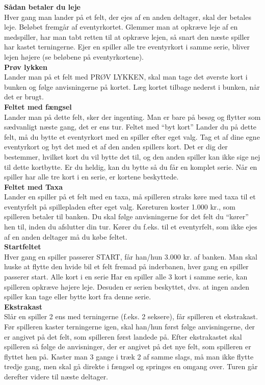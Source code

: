 \textbf{Sådan betaler du leje}
\\Hver gang man lander på et felt, der ejes af en anden deltager, skal der betales leje. Beløbet fremgår af eventyrkortet. Glemmer man at opkræve leje af en medspiller, har man tabt retten til at opkræve lejen, så snart den næste spiller har kastet terningerne. Ejer en spiller alle tre eventyrkort i samme serie, bliver lejen højere (se beløbene på eventyrkortene).\\

\textbf{Prøv lykken}
\\Lander man på et felt med PRØV LYKKEN, skal man tage det øverste kort i bunken og følge anvisningerne på kortet. 
Læg kortet tilbage nederst i bunken, når det er brugt.\\

\textbf{Feltet med fængsel}
\\Lander man på dette felt, sker der ingenting. 
Man er bare på besøg og flytter som sædvanligt næste gang, det er ens tur. Feltet med “byt kort”
Lander du på dette felt, må du bytte et eventyrkort med en spiller efter eget valg. 
Tag et af dine egne eventyrkort og byt det med et af den anden spillers kort. 
Det er dig der bestemmer, hvilket kort du vil bytte det til, og den anden spiller kan ikke sige nej til dette kortbytte. 
Er du heldig, kan du bytte så du får en komplet serie. 
Når en spiller har alle tre kort i en serie, er kortene beskyttede.\\

\textbf{Feltet med Taxa}
\\Lander en spiller på et felt med en taxa, må spilleren straks køre med taxa til et eventyrfelt på spillepladen efter eget valg. 
Køreturen koster 1.000 kr., som spilleren betaler til banken. 
Du skal følge anvisningerne for det felt du “kører” hen til, inden du afslutter din tur. 
Kører du f.eks. til et eventyrfelt, som ikke ejes af en anden deltager må du købe feltet.\\

\textbf{Startfeltet}
\\Hver gang en spiller passerer START, får han/hun 3.000 kr. af banken. Man skal huske at flytte den hvide bil et felt fremad på inderbanen, hver gang en spiller passerer start. Alle kort i en serie
Har en spiller alle 3 kort i samme serie, kan spilleren opkræve højere leje. Desuden er serien beskyttet, dvs. at ingen anden spiller kan tage eller bytte kort fra denne serie.\\

\textbf{Ekstrakast}
\\Slår en spiller 2 ens med terningerne (f.eks. 2 seksere), får spilleren et ekstrakast. 
Før spilleren kaster terningerne igen, skal han/hun først følge anvisningerne, der er angivet på det felt, som spilleren først landede på. 
Efter ekstrakastet skal spilleren så følge de anvisninger, der er angivet på det nye felt, som spilleren er flyttet hen på. 
Kaster man 3 gange i træk 2 af samme slags, må man ikke flytte tredje gang, men skal gå direkte i fængsel og springes en omgang over. 
Turen går derefter videre til næste deltager.\\


